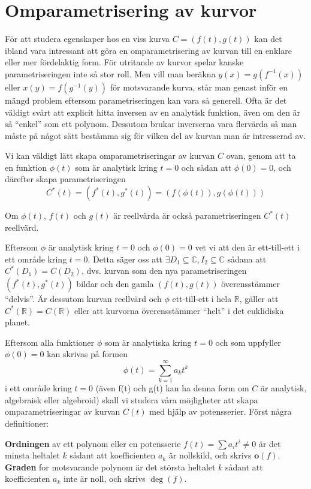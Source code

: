 \section{Omparametrisering av kurvor}

För att studera egenskaper hos en viss kurva $C = (f(t), g(t))$ kan det ibland vara intressant att göra en omparametrisering av kurvan till en enklare eller mer fördelaktig form. För utritande av kurvor spelar kanske parametriseringen inte så stor roll. Men vill man beräkna $y(x) = g(f^{-1}(x))$ eller $x(y) = f(g^{-1}(y))$ för motsvarande kurva, står man genast inför en mängd problem eftersom parametriseringen kan vara så generell. Ofta är det väldigt svårt att explicit hitta inversen av en analytisk funktion, även om den är så ``enkel'' som ett polynom. Dessutom brukar inverserna vara flervärda så man måste på något sätt bestämma sig för vilken del av kurvan man är intresserad av.

Vi kan väldigt lätt skapa omparametriseringar av kurvan $C$ ovan, genom
att ta en funktion $\phi(t)$ som är analytisk kring $t = 0$ och sådan att $\phi(0) = 0$, och därefter skapa parametriseringen \[C^*(t) = (f^*(t), g^*(t)) = (f(\phi(t)), g(\phi(t)))\]

Om $\phi(t)$, $f(t)$ och $g(t)$ är reellvärda är också parametriseringen $C^*(t)$ reellvärd.

Eftersom $\phi$ är analytisk kring $t = 0$ och $\phi(0) = 0$ vet vi att den är ett-till-ett i ett område kring $t = 0$. Detta säger oss att $\exists D_1 \subseteq \mathbb{C}, I_2 \subseteq \mathbb{C}$ sådana att $C^*(D_1) = C(D_2)$, dvs. kurvan som den nya parametriseringen $(f^*(t), g^*(t))$ bildar och den gamla $(f(t), g(t))$ överensstämmer ``delvis''. Är dessutom kurvan reellvärd och $\phi$ ett-till-ett i hela $\mathbb{R}$, gäller att $C^*(\mathbb{R}) = C(\mathbb{R})$ eller att kurvorna överensstämmer ``helt'' i det euklidiska planet.

Eftersom alla funktioner $\phi$ som är analytiska kring $t = 0$ och som uppfyller $\phi(0) = 0$ kan skrivas på formen \[\phi(t)=\sum_{k=1}^{\infty}a_k t^k\] i ett område kring $t = 0$ (även f(t) och g(t) kan ha denna form om $C$ är analytisk, algebraisk eller algebroid) skall vi studera våra möjligheter att skapa omparametriseringar av kurvan $C(t)$ med hjälp av potensserier. Först några definitioner:

\begin{Definition}
\textbf{Ordningen} av ett polynom eller en potensserie $f(t) =
\sum a_i t^i \neq 0$ är det minsta heltalet $k$ sådant att koefficienten $a_k$ är nollskild, och skrivs $\mathbf{o}(f)$. \textbf{Graden} for motsvarande polynom är det största heltalet $k$ sådant att koefficienten $a_k$ inte är noll, och skrivs $\deg(f)$.
\end{Definition}


